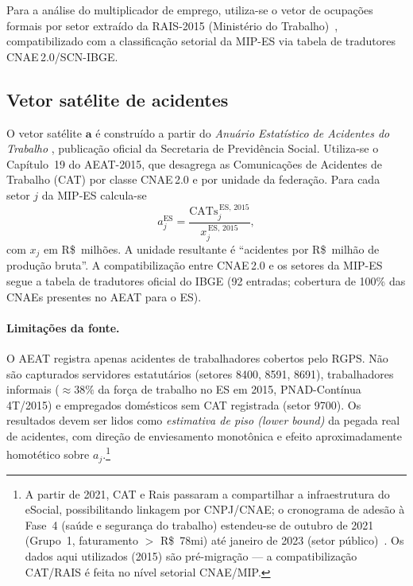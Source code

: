 \documentclass[12pt, a4paper]{article}
\begin{document}
Para a análise do multiplicador de emprego, utiliza-se o vetor de
ocupações formais por setor extraído da RAIS-2015 (Ministério do
Trabalho)~\citep{corseuil2026rais}, compatibilizado com a classificação
setorial da MIP-ES via tabela de tradutores CNAE\,2.0/SCN-IBGE.

\subsection{Vetor satélite de acidentes}

O vetor satélite $\mathbf{a}$ é construído a partir do
\textit{Anuário Estatístico de Acidentes do Trabalho}
\citep{aeat2016}, publicação oficial da Secretaria de Previdência Social.
Utiliza-se o Capítulo~19 do AEAT-2015, que desagrega as Comunicações de
Acidentes de Trabalho (CAT) por classe CNAE\,2.0 e por unidade da
federação. Para cada setor $j$ da MIP-ES calcula-se
%
\begin{equation}
a_j^{\text{ES}} = \frac{\text{CATs}_j^{\,\text{ES, 2015}}}{x_j^{\,\text{ES, 2015}}},
\label{eq:aj}
\end{equation}
%
com $x_j$ em R\$~milhões. A unidade resultante é
``acidentes por R\$~milhão de produção bruta''.
A compatibilização entre CNAE\,2.0 e os setores da MIP-ES segue a
tabela de tradutores oficial do IBGE (92 entradas; cobertura de 100\%
das CNAEs presentes no AEAT para o ES).

\paragraph{Limitações da fonte.}
O AEAT registra apenas acidentes de trabalhadores cobertos pelo RGPS.
Não são capturados servidores estatutários (setores 8400, 8591, 8691),
trabalhadores informais ($\approx 38\%$ da força de trabalho no ES em
2015, PNAD-Contínua 4T/2015) e empregados domésticos sem CAT registrada
(setor 9700). Os resultados devem ser lidos como \textit{estimativa de
piso (lower bound)} da pegada real de acidentes, com direção de
enviesamento monotônica e efeito aproximadamente homotético sobre $a_j$.\footnote{A partir de 2021, CAT e Rais passaram a compartilhar a infraestrutura do eSocial, possibilitando linkagem por CNPJ/CNAE; o cronograma de adesão à Fase~4 (saúde e segurança do trabalho) estendeu-se de outubro de 2021 (Grupo~1, faturamento $>$ R\$~78mi) até janeiro de 2023 (setor público)~\citep[cap.~6]{corseuil2026rais}. Os dados aqui utilizados (2015) são pré-migração --- a compatibilização CAT/RAIS é feita no nível setorial CNAE/MIP.}
\end{document}
